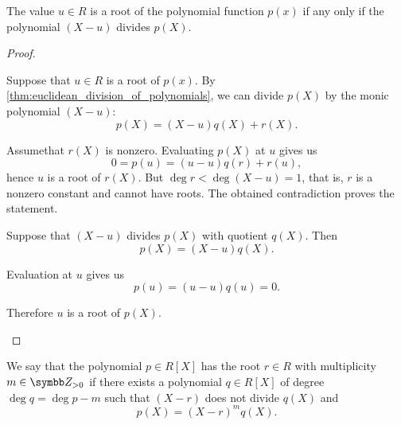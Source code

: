 \begin{proposition}\label{thm:polynomial_root_iff_divisible}
  The value \( u \in R \) is a root of the polynomial function \( p(x) \) if any only if the polynomial \( (X - u) \) divides \( p(X) \).
\end{proposition}
\begin{proof}
  \begin{description}
    \Implies Suppose that \( u \in R \) is a root of \( p(x) \). By \cref{thm:euclidean_division_of_polynomials}, we can divide \( p(X) \) by the monic polynomial \( (X - u) \):
    \begin{equation*}
      p(X) = (X - u) q(X) + r(X).
    \end{equation*}

    Assume\LEM that \( r(X) \) is nonzero. Evaluating \( p(X) \) at \( u \) gives us
    \begin{equation*}
      0 = p(u) = (u - u) q(r) + r(u),
    \end{equation*}
    hence \( u \) is a root of \( r(X) \). But \( \deg r < \deg (X - u) = 1 \), that is, \( r \) is a nonzero constant and cannot have roots. The obtained contradiction proves the statement.

    \ImpliedBy Suppose that \( (X - u) \) divides \( p(X) \) with quotient \( q(X) \). Then
    \begin{equation*}
      p(X) = (X - u) q(X).
    \end{equation*}

    Evaluation at \( u \) gives us
    \begin{equation*}
      p(u) = (u - u) q(u) = 0.
    \end{equation*}

    Therefore \( u \) is a root of \( p(X) \).
  \end{description}
\end{proof}

\begin{definition}\label{def:polynomial_root_multiplicity}
  We say that the polynomial \( p \in R[X] \) has the root \( r \in R \) with multiplicity \( m \in \Z_{>0} \) if there exists a polynomial \( q \in R[X] \) of degree \( \deg q = \deg p - m \) such that \( (X - r) \) does not divide \( q(X) \) and
  \begin{equation*}
    p(X) = (X - r)^m q(X).
  \end{equation*}
\end{definition}

